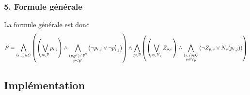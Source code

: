     \subsubsection*{5. Formule générale}
    La formule générale est donc
    \[F = \bigwedge_{(i,j)\in C} \left(\left(\bigvee_{p\in\mathbb{P}} p_{i,j} \right) \land
        \bigwedge_{\substack{(p,p')\in\mathbb{P}^2\\p<p'}}\left(\lnot p_{i,j} \lor \lnot p'_{i,j}\right)\right) \land
        \bigwedge_{p\in\mathbb{P}} \left(\left( \bigvee_{v\in\mathbb{V}_p} Z_{p,v} \right) \land
        \bigwedge_{\substack{(i,j)\in C\\v\in\mathbb{V}_p}} \left(\lnot Z_{p,v} \lor N_v(p_{i,j}) \right)\right)\]
    
    \subsection*{Implémentation}
    

